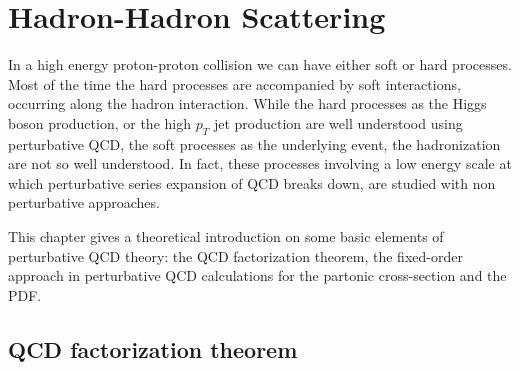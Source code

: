 %
%
%

%


\chapter{Hadron-Hadron Scattering}
\label{chap:Hadron-HadronScattering}

In a high energy proton-proton collision we can have either soft or hard processes.
Most of the time the hard processes are accompanied by soft interactions, occurring along the hadron interaction.
While the hard processes as the Higgs boson production, or the high $p_T$ jet production are well understood using perturbative QCD, the soft processes as the underlying event, the hadronization are not so well understood. In fact, these processes involving a low energy scale at which perturbative series expansion of QCD breaks down, are studied with non perturbative approaches. 

This chapter gives a theoretical introduction on some basic elements of perturbative QCD theory: the QCD factorization theorem, the fixed-order approach in perturbative QCD calculations for the partonic cross-section and the PDF.  


\section{QCD factorization theorem}

